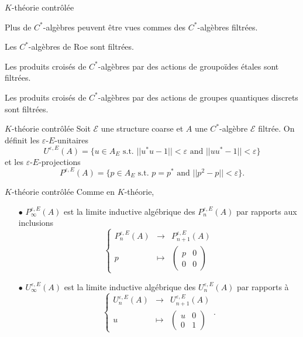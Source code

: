 \begin{frame}{$K$-théorie contrôlée}

Plus de $C^*$-algèbres peuvent être vues commes des $C^*$-algèbres filtrées.

\begin{exple}
Les $C^*$-algèbres de Roe sont filtrées.
\end{exple}

\begin{exple}
Les produits croisés de $C^*$-algèbres par des actions de groupoïdes étales sont filtrées.
\end{exple}

\begin{exple}
Les produits croisés de $C^*$-algèbres par des actions de groupes quantiques discrets sont filtrées.
\end{exple}

\end{frame}

\begin{frame}{$K$-théorie contrôlée}
Soit $\mathcal E$ une structure coarse et $A$ une $C^*$-algèbre $\mathcal E$ filtrée. On définit les $\varepsilon$-$E$-unitaires
\[U^{\varepsilon, E}(A)= \{u\in A_E \text{ s.t. } ||u^*u-1||<\varepsilon\text{ and }||uu^*-1||<\varepsilon \}\]
et les $\varepsilon$-$E$-projections 
\[P^{\varepsilon, E}(A)= \{p\in A_E \text{ s.t. } p=p^*\text{ and }||p^2-p||<\varepsilon \}.\]
\end{frame}

\begin{frame}{$K$-théorie contrôlée}
Comme en $K$-théorie, 
\begin{itemize}
\item[$\bullet$] $P_\infty^{\varepsilon, E}(A)$ est la limite inductive algébrique des $P_n^{\varepsilon, E}(A)$ par rapports aux inclusions
\[\left\{\begin{array}{rcl}
	P^{\varepsilon,E}_n(A) 		& \rightarrow	& P^{\varepsilon,E}_{n+1}(A)\\ 
	p 		& \mapsto 	& \begin{pmatrix}p& 0 \\ 0&0 \end{pmatrix}
\end{array}\right.\]
\item[$\bullet$] $U_\infty^{\varepsilon, E}(A)$ est la limite inductive algébrique des $U_n^{\varepsilon, E}(A)$ par rapports à
\[\left\{\begin{array}{rcl}
	U^{\varepsilon,E}_n(A) 		& \rightarrow	& U^{\varepsilon,E}_{n+1}(A)\\ 
	u 		& \mapsto 	& \begin{pmatrix}u & 0 \\ 0& 1 \end{pmatrix}
\end{array}\right. .\]
\end{itemize}
\end{frame}

